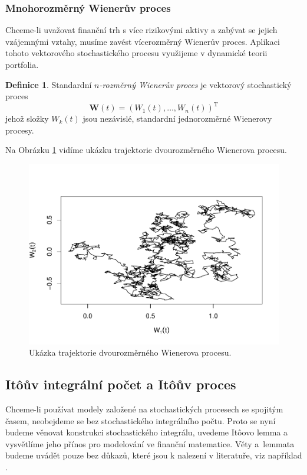 \documentclass[a4paper,12pt]{report}
\theoremstyle{definition} \newtheorem{definice}[veta]{Definice}
\theoremstyle{remark}
\begin{document}
\subsubsection{Mnohorozměrný Wienerův proces}
Chceme-li uvažovat finanční trh s více rizikovými aktivy a zabývat se jejich vzájemnými vztahy, musíme zavést vícerozměrný Wienerův proces.
Aplikaci tohoto vektorového stochastického procesu využijeme v dynamické teorii portfolia.

\begin{definice}
Standardní \textit{$n$-rozměrný Wienerův proces} je vektorový stochastický proces
$$\boldsymbol{W}(t) = (W_1(t), \dots, W_n(t))^\mathrm{T}$$
jehož složky $W_k(t)$ jsou nezávislé, standardní jednorozměrné Wienerovy procesy.
\end{definice}

Na Obrázku \ref{WP_2D_graf} vidíme ukázku trajektorie dvourozměrného Wienerova procesu.
\begin{figure}[!htbp]
  \centering 
	\includegraphics[width=13.5cm, clip, trim= 0 20 25 50]{IMG/WP_2D_v6.pdf}
  \caption{Ukázka trajektorie dvourozměrného Wienerova procesu.}  \label{WP_2D_graf}
\end{figure}


\subsection{It\^oův integrální počet a It\^oův proces}\label{Ito_kalkul}
Chceme-li používat modely založené na stochastických procesech se spojitým časem, neobejdeme se bez stochastického integrálního počtu.
Proto se nyní budeme věnovat konstrukci stochastického integrálu, uvedeme It\^oovo lemma a vysvětlíme jeho přínos pro modelování ve finanční matematice.
Věty a~lemmata budeme uvádět pouze bez důkazů, které jsou k nalezení v literatuře, viz například \cite{karatzas2012brownian}.
\end{document}

